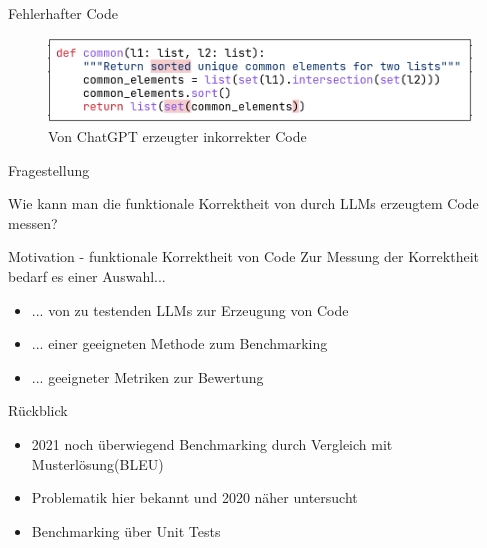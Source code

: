 \documentclass{beamer}              %
\begin{document}
\begin{frame}{Fehlerhafter Code}
    \begin{figure}
        \centering
        \includegraphics[width=0.8\paperwidth]{images/sortedlistwrongnoHE.png}
        \caption{Von ChatGPT erzeugter inkorrekter Code\cite{liu2024your}}
    \end{figure}

\begin{frame}{Fragestellung}

\centering Wie kann man die funktionale Korrektheit von durch LLMs erzeugtem Code messen?

\end{frame}

\begin{frame}{Motivation - funktionale Korrektheit von Code}
Zur Messung der Korrektheit bedarf es einer Auswahl...
\begin{itemize}
    \item ... von zu testenden LLMs zur Erzeugung von Code
    \item ... einer geeigneten Methode zum Benchmarking
    \item ... geeigneter Metriken zur Bewertung
\end{itemize}
\end{frame}

\begin{frame}{Rückblick}
\begin{itemize}
    \item 2021 noch überwiegend Benchmarking durch Vergleich mit Musterlösung(BLEU)\cite{chen2021evaluating}
    \item Problematik hier bekannt und 2020 näher untersucht\cite{ren2020codebleu}
    \item Benchmarking über Unit Tests\cite{osti_10195511}\cite{chen2021evaluating}
\end{itemize}
\end{frame}


\end{frame}
\end{document}
